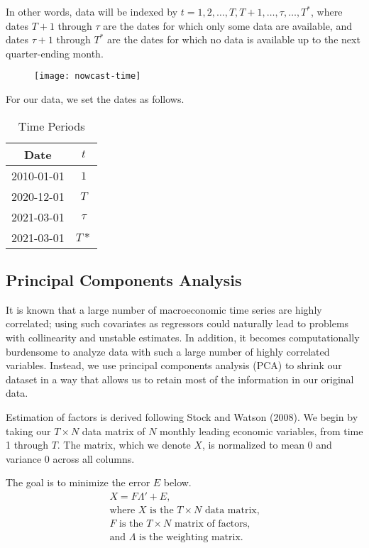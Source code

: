 \documentclass[11pt, letterpaper]{article}\usepackage[]{graphicx}\usepackage[]{color}
\begin{document}
In other words, data will be indexed by $t = 1, 2, \dots, T, T+1, \dots, \tau, \dots, T^*$, where dates $T + 1$ through $\tau$ are the dates for which only some data are available, and dates $\tau + 1$ through $T^*$ are the dates for which no data is available up to the next quarter-ending month.
\begin{figure}[H]
\texttt{[image: nowcast-time]}
\centering
\end{figure}
For our data, we set the dates as follows.
\begin{table}[H]
\centering
\begingroup\footnotesize
\begin{tabular}{cc}
  \hline
Date & $t$ \\ 
  \hline
2010-01-01 & $1$ \\ 
  2020-12-01 & $T$ \\ 
  2021-03-01 & $\tau$ \\ 
  2021-03-01 & $T*$ \\ 
   \hline
\end{tabular}
\endgroup
\caption{Time Periods} 
\end{table}


\subsection{Principal Components Analysis}
It is known that a large number of macroeconomic time series are highly correlated; using such covariates as regressors could naturally lead to problems with collinearity and unstable estimates. In addition, it becomes computationally burdensome to analyze data with such a large number of highly correlated variables. Instead, we use principal components analysis (PCA) to shrink our dataset in a way that allows us to retain most of the information in our original data.

Estimation of factors is derived following Stock and Watson (2008). We begin by taking our $T \times N$ data matrix of $N$ monthly leading economic variables, from time 1 through $T$. The matrix, which we denote $X$, is normalized to mean 0 and variance 0 across all columns.

The goal is to minimize the error $E$ below.
\begin{align*}
	X = F  \Lambda ' + E,\\
	\text{where $X$ is the $T \times N$ data matrix,}\\
	\text{$F$ is the $T \times N$ matrix of factors,}\\
	\text{and $\Lambda$ is the weighting matrix.}\\
\end{align*}
\end{document}
